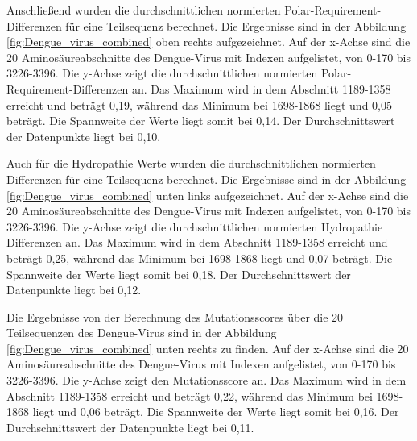 \documentclass[german,version-2022-01]{uzl-thesis}
\begin{document}
Anschlie\ss{}end wurden die durchschnittlichen normierten Polar-Requirement-Differenzen f\"ur eine Teilsequenz berechnet. Die Ergebnisse sind in der Abbildung \ref{fig:Dengue_virus_combined} oben rechts aufgezeichnet. Auf der x-Achse sind die 20 Aminos\"aureabschnitte des Dengue-Virus mit Indexen aufgelistet, von 0-170 bis 3226-3396. Die y-Achse zeigt die durchschnittlichen normierten Polar-Requirement-Differenzen an. Das Maximum wird in dem Abschnitt 1189-1358 erreicht und betr\"agt 0,19, w\"ahrend das Minimum bei 1698-1868 liegt und 0,05 betr\"agt. Die Spannweite der Werte liegt somit bei 0,14. Der Durchschnittswert der Datenpunkte liegt bei 0,10. 

Auch f\"ur die Hydropathie Werte wurden die durchschnittlichen normierten Differenzen f\"ur eine Teilsequenz berechnet. Die Ergebnisse sind in der Abbildung \ref{fig:Dengue_virus_combined} unten links aufgezeichnet. Auf der x-Achse sind die 20 Aminos\"aureabschnitte des Dengue-Virus mit Indexen aufgelistet, von 0-170 bis 3226-3396. Die y-Achse zeigt die durchschnittlichen normierten Hydropathie Differenzen an. Das Maximum wird in dem Abschnitt 1189-1358 erreicht und betr\"agt 0,25, w\"ahrend das Minimum bei 1698-1868 liegt und 0,07 betr\"agt. Die Spannweite der Werte liegt somit bei 0,18. Der Durchschnittswert der Datenpunkte liegt bei 0,12.

Die Ergebnisse von der Berechnung des Mutationsscores \"uber die 20 Teilsequenzen des Dengue-Virus sind in der Abbildung \ref{fig:Dengue_virus_combined} unten rechts zu finden. Auf der x-Achse sind die 20 Aminos\"aureabschnitte des Dengue-Virus mit Indexen aufgelistet, von 0-170 bis 3226-3396. Die y-Achse zeigt den Mutationsscore an. Das Maximum wird in dem Abschnitt 1189-1358 erreicht und betr\"agt 0,22, w\"ahrend das Minimum bei 1698-1868 liegt und 0,06 betr\"agt. Die Spannweite der Werte liegt somit bei 0,16. Der Durchschnittswert der Datenpunkte liegt bei 0,11. 
\end{document}

